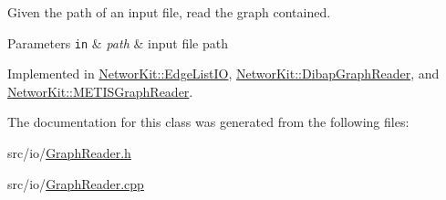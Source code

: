 Given the path of an input file, read the graph contained. 


\begin{DoxyParams}[1]{Parameters}
\mbox{\tt in}  & {\em path} & input file path \\
\hline
\end{DoxyParams}


Implemented in \hyperlink{class_networ_kit_1_1_edge_list_i_o_ac0847b12d46c5b448f3a84e48e1992c5}{Networ\-Kit\-::\-Edge\-List\-I\-O}, \hyperlink{class_networ_kit_1_1_dibap_graph_reader_a013e1ac2d88acd1d9d312b3a3a4d37f6}{Networ\-Kit\-::\-Dibap\-Graph\-Reader}, and \hyperlink{class_networ_kit_1_1_m_e_t_i_s_graph_reader_a82e63d4d0e6383be034db6082478a94d}{Networ\-Kit\-::\-M\-E\-T\-I\-S\-Graph\-Reader}.



The documentation for this class was generated from the following files\-:\begin{DoxyCompactItemize}
\item 
src/io/\hyperlink{_graph_reader_8h}{Graph\-Reader.\-h}\item 
src/io/\hyperlink{_graph_reader_8cpp}{Graph\-Reader.\-cpp}\end{DoxyCompactItemize}
